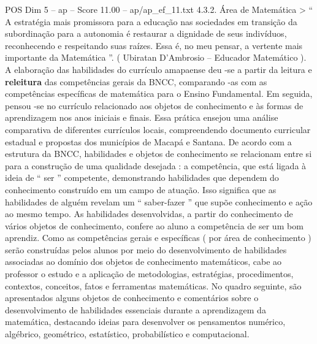 \begin{textsample}{POS Dim 5 – ap – Score 11.00 – ap/ap\_ef\_11.txt}  \label{ex:f5_pos_161}
4.3.2.
Área de Matemática > “ A estratégia mais promissora para a educação nas sociedades em transição da subordinação para a autonomia é restaurar a dignidade de seus indivíduos, reconhecendo e respeitando suas raízes.
Essa é, no meu pensar, a vertente mais importante da Matemática ”. ( Ubiratan D’Ambrosio – Educador Matemático ).
A elaboração das habilidades do currículo amapaense deu -se a partir da leitura e \textbf{releitura} das competências gerais da BNCC, comparando -as com as competências específicas de matemática para o Ensino Fundamental.
Em seguida, pensou -se no currículo relacionado aos objetos de conhecimento e às formas de aprendizagem nos anos iniciais e finais.
Essa prática ensejou uma análise comparativa de diferentes currículos locais, compreendendo documento curricular estadual e propostas dos municípios de Macapá e Santana.
De acordo com a estrutura da BNCC, habilidades e objetos de conhecimento se relacionam entre si para a construção de uma qualidade desejada : a competência, que está ligada à ideia de “ ser ” competente, demonstrando habilidades que dependem do conhecimento construído em um campo de atuação.
Isso significa que as habilidades de alguém revelam um “ saber-fazer ” que supõe conhecimento e ação ao mesmo tempo.
As habilidades desenvolvidas, a partir do conhecimento de vários objetos de conhecimento, confere ao aluno a competência de ser um bom aprendiz.
Como as competências gerais e específicas ( por área de conhecimento ) serão construídas pelos alunos por meio do desenvolvimento de habilidades associadas ao domínio dos objetos de conhecimento matemáticos, cabe ao professor o estudo e a aplicação de metodologias, estratégias, procedimentos, contextos, conceitos, fatos e ferramentas matemáticas.
No quadro seguinte, são apresentados alguns objetos de conhecimento e comentários sobre o desenvolvimento de habilidades essenciais durante a aprendizagem da matemática, destacando ideias para desenvolver os pensamentos numérico, algébrico, geométrico, estatístico, probabilístico e computacional.

\end{textsample}
